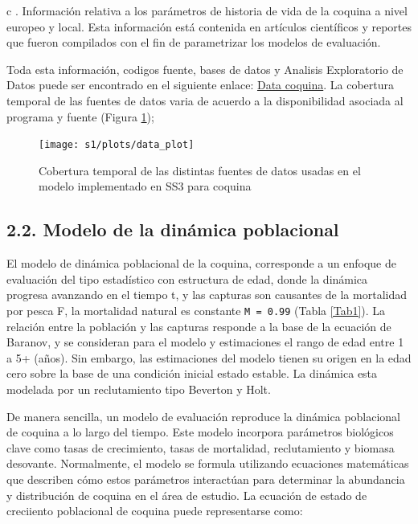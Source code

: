 \documentclass[
]{article}
\begin{document}
c . Información relativa a los parámetros de historia de vida de la coquina a nivel europeo y local. Esta información está contenida en artículos científicos y reportes que fueron compilados con el fin de parametrizar los modelos de evaluación.

Toda esta información, codigos fuente, bases de datos y Analisis Exploratorio de Datos puede ser encontrado en el siguiente enlace: \href{https://mauromardones.github.io/EDA_Donux_trunculus_2023/}{Data coquina}. La cobertura temporal de las fuentes de datos varia de acuerdo a la disponibilidad asociada al programa y fuente (Figura \ref{fig:data});

\begin{figure}[H]

{\centering \texttt{[image: s1/plots/data\_plot]} 

}

\caption{\label{data}Cobertura temporal de las distintas fuentes de datos usadas en el modelo implementado en SS3 para coquina}\label{fig:data}
\end{figure}

\hypertarget{modelo-de-la-dinuxe1mica-poblacional}{%
\subsection{2.2. Modelo de la dinámica poblacional}\label{modelo-de-la-dinuxe1mica-poblacional}}

El modelo de dinámica poblacional de la coquina, corresponde a un enfoque de evaluación del tipo estadístico con estructura de edad, donde la dinámica progresa avanzando en el tiempo t, y las capturas son causantes de la mortalidad por pesca F, la mortalidad natural es constante \texttt{M\ =\ 0.99} (Tabla \ref{Tab1}). La relación entre la población y las capturas responde a la base de la ecuación de Baranov, y se consideran para el modelo y estimaciones el rango de edad entre 1 a 5+ (años). Sin embargo, las estimaciones del modelo tienen su origen en la edad cero sobre la base de una condición inicial estado estable. La dinámica esta modelada por un reclutamiento tipo Beverton y Holt.

De manera sencilla, un modelo de evaluación reproduce la dinámica poblacional de coquina a lo largo del tiempo. Este modelo incorpora parámetros biológicos clave como tasas de crecimiento, tasas de mortalidad, reclutamiento y biomasa desovante. Normalmente, el modelo se formula utilizando ecuaciones matemáticas que describen cómo estos parámetros interactúan para determinar la abundancia y distribución de coquina en el área de estudio. La ecuación de estado de creciiento poblacional de coquina puede representarse como:
\end{document}
